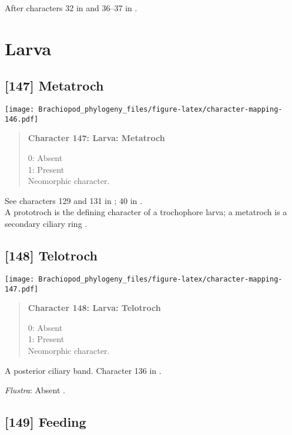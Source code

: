 \documentclass[openany]{book}
\theoremstyle{definition}
\theoremstyle{definition}
\theoremstyle{definition}
\theoremstyle{remark}
\begin{document}
After characters 32 in \citet{Grobe2007} and 36--37 in
\citet{Glenner2004}.

\section{Larva}\label{larva}

\subsection*{{[}147{]} Metatroch}\label{metatroch}

\texttt{[image: Brachiopod\_phylogeny\_files/figure-latex/character-mapping-146.pdf]}

\begin{quote}
\textbf{Character 147: Larva: Metatroch}

0: Absent\\
1: Present\\
Neomorphic character.
\end{quote}

See characters 129 and 131 in \citet{Rouse1999}; 40 in
\citet{Haszprunar1996}.\\
A prototroch is the defining character of a trochophore larva; a
metatroch is a secondary ciliary ring \citep{Rouse1999}.

\subsection*{{[}148{]} Telotroch}\label{telotroch}

\texttt{[image: Brachiopod\_phylogeny\_files/figure-latex/character-mapping-147.pdf]}

\begin{quote}
\textbf{Character 148: Larva: Telotroch}

0: Absent\\
1: Present\\
Neomorphic character.
\end{quote}

A posterior ciliary band. Character 136 in \citet{Rouse1999}.

\hypertarget{Flustra-coding-148}{}
\emph{Flustra}: Absent \citep{Zimmer2013}.

\subsection*{{[}149{]} Feeding}\label{feeding}
\end{document}
